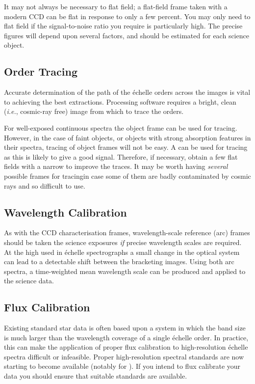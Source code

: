It may not always be necessary to flat field; a flat-field frame
taken with a modern CCD can be flat in response to only a few percent.
You may only need to flat field if the signal-to-noise ratio you
require is particularly high.  The precise figures will depend upon
several factors, and should be estimated for each science object.


\subsection{Order Tracing}

Accurate determination of the path of the \'{e}chelle orders across the
images is vital to achieving the best extractions.  Processing software
requires a bright, clean ({\em{i.e.}}, cosmic-ray free) image from which
to trace the orders.

For well-exposed continuous spectra the object frame can be used for
tracing.  However, in the case of faint objects, or
objects with strong absorption features in their spectra, tracing of
object frames will not be easy.
A  can be used for tracing as
this is likely to give a good signal.
Therefore, if necessary, obtain a few flat fields with a narrow
 to improve the traces.
It may be worth having {\em several} possible frames for
tracing\sgspec{---}{ - }in case some of them are badly contaminated
by cosmic rays and so difficult to use.


\subsection{Wavelength Calibration}

As with the CCD characterisation frames, wavelength-scale reference
(arc) frames should be taken  the
science exposures {\em if} precise wavelength scales are required.
At the high 
used in \'{e}chelle spectrographs a small
change in the optical system can lead to a detectable shift between the
bracketing images.
Using both arc spectra, a time-weighted mean wavelength scale can be
produced and applied to the science data.


\subsection{Flux Calibration}

Existing standard star data is often based upon a system in which the
band size is much larger than the wavelength coverage of
a single \'{e}chelle order.  In practice, this can make the application
of proper flux calibration to high-resolution \'{e}chelle spectra
difficult or infeasible.  Proper high-resolution spectral standards are
now starting to become available (notably for )\@.
If you intend to flux calibrate your data you should ensure that suitable
standards are available.

